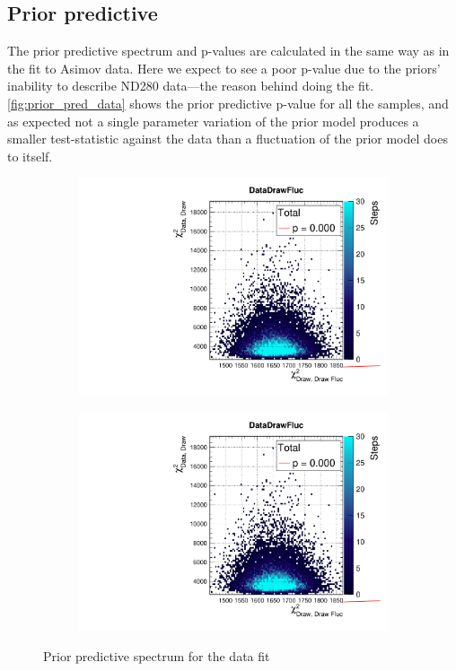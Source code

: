 \subsection{Prior predictive}
\label{sec:prior_pred_data}
The prior predictive spectrum and p-values are calculated in the same way as in the fit to Asimov data. Here we expect to see a poor p-value due to the priors' inability to describe ND280 data---the reason behind doing the fit. \autoref{fig:prior_pred_data} shows the prior predictive p-value for all the samples, and as expected not a single parameter variation of the prior model produces a smaller test-statistic against the data than a fluctuation of the prior model does to itself.
\begin{figure}[h]
	\begin{subfigure}[t]{0.49\textwidth}
		\includegraphics[width=\textwidth, trim={0mm 0mm 0mm 11mm}, clip,page=1]{figures/mach3/data/priorpred/2017b_NewDet_3Xsec_4Det_5Flux_NewXSecTune_Data_merge_PriorPred_procs}
	\end{subfigure}
	\begin{subfigure}[t]{0.49\textwidth}
		\includegraphics[width=\textwidth, trim={0mm 0mm 0mm 11mm}, clip,page=2]{figures/mach3/data/priorpred/2017b_NewDet_3Xsec_4Det_5Flux_NewXSecTune_Data_merge_PriorPred_procs}
	\end{subfigure}
	\caption{Prior predictive spectrum for the data fit}
	\label{fig:prior_pred_data}
\end{figure}

